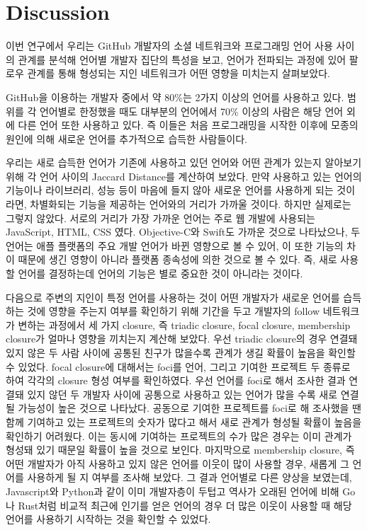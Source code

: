 \documentclass[10pt, a4paper, titlepage]{article}
\begin{document}
\section{Discussion}

이번 연구에서 우리는 GitHub 개발자의 소셜 네트워크와 프로그래밍 언어 사용 사이의 관계를 분석해 언어별 개발자 집단의 특성을 보고, 언어가 전파되는 과정에 있어 팔로우 관계를 통해 형성되는 지인 네트워크가 어떤 영향을 미치는지 살펴보았다.

GitHub을 이용하는 개발자 중에서 약 80\%는 2가지 이상의 언어를 사용하고 있다. 범위를 각 언어별로 한정했을 때도 대부분의 언어에서 70\% 이상의 사람은 해당 언어 외에 다른 언어 또한 사용하고 있다. 즉 이들은 처음 프로그래밍을 시작한 이후에 모종의 원인에 의해 새로운 언어를 추가적으로 습득한 사람들이다.

우리는 새로 습득한 언어가 기존에 사용하고 있던 언어와 어떤 관계가 있는지 알아보기 위해 각 언어 사이의 Jaccard Distance를 계산하여 보았다. 만약 사용하고 있는 언어의 기능이나 라이브러리, 성능 등이 마음에 들지 않아 새로운 언어를 사용하게 되는 것이라면, 차별화되는 기능을 제공하는 언어와의 거리가 가까울 것이다. 하지만 실제로는 그렇지 않았다. 서로의 거리가 가장 가까운 언어는 주로 웹 개발에 사용되는 JavaScript, HTML, CSS 였다. Objective-C와 Swift도 가까운 것으로 나타났으나, 두 언어는 애플 플랫폼의 주요 개발 언어가 바뀐 영향으로 볼 수 있어, 이 또한 기능의 차이 때문에 생긴 영향이 아니라 플랫폼 종속성에 의한 것으로 볼 수 있다. 즉, 새로 사용할 언어를 결정하는데 언어의 기능은 별로 중요한 것이 아니라는 것이다.

다음으로 주변의 지인이 특정 언어를 사용하는 것이 어떤 개발자가 새로운 언어를 습득하는 것에 영향을 주는지 여부를 확인하기 위해 기간을 두고 개발자의 follow 네트워크가 변하는 과정에서 세 가지 closure, 즉 triadic closure, focal closure, membership closure가 얼마나 영향을 끼치는지 계산해 보았다. 우선 triadic closure의 경우 연결돼 있지 않은 두 사람 사이에 공통된 친구가 많을수록 관계가 생길 확률이 높음을 확인할 수 있었다. focal closure에 대해서는 foci를 언어, 그리고 기여한 프로젝트 두 종류로 하여 각각의 closure 형성 여부를 확인하였다. 우선 언어를 foci로 해서 조사한 결과 연결돼 있지 않던 두 개발자 사이에 공통으로 사용하고 있는 언어가 많을 수록 새로 연결될 가능성이 높은 것으로 나타났다. 공동으로 기여한 프로젝트를 foci로 해 조사했을 땐 함께 기여하고 있는 프로젝트의 숫자가 많다고 해서 새로 관계가 형성될 확률이 높음을 확인하기 어려웠다. 이는 동시에 기여하는 프로젝트의 수가 많은 경우는 이미 관계가 형성돼 있기 때문일 확률이 높을 것으로 보인다. 마지막으로 membership closure, 즉 어떤 개발자가 아직 사용하고 있지 않은 언어를 이웃이 많이 사용할 경우, 새롭게 그 언어를 사용하게 될 지 여부를 조사해 보았다. 그 결과 언어별로 다른 양상을 보였는데, Javascript와 Python과 같이 이미 개발자층이 두텁고 역사가 오래된 언어에 비해 Go나 Rust처럼 비교적 최근에 인기를 얻은 언어의 경우 더 많은 이웃이 사용할 때 해당 언어를 사용하기 시작하는 것을 확인할 수 있었다.
\end{document}
